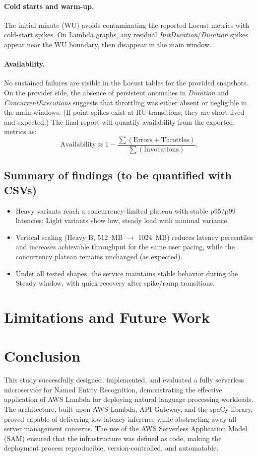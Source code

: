 \documentclass[11pt,a4paper]{article}
\begin{document}
\paragraph{Cold starts and warm-up.}
The initial minute (WU) avoids contaminating the reported Locust metrics with cold-start spikes. On Lambda graphs, any residual \emph{InitDuration}/\emph{Duration} spikes appear near the WU boundary, then disappear in the main window.

\paragraph{Availability.}
No sustained failures are visible in the Locust tables for the provided snapshots. On the provider side, the absence of persistent anomalies in \emph{Duration} and \emph{ConcurrentExecutions} suggests that throttling was either absent or negligible in the main windows. (If point spikes exist at RU transitions, they are short-lived and expected.) The final report will quantify availability from the exported metrics as:
\[
\text{Availability} \approx 1 - \frac{\sum(\text{Errors} + \text{Throttles})}{\sum(\text{Invocations})}.
\]

\subsection{Summary of findings (to be quantified with CSVs)}
\begin{itemize}
  \item Heavy variants reach a concurrency-limited plateau with stable p95/p99 latencies; Light variants show low, steady load with minimal variance.
  \item Vertical scaling (Heavy B, \SI{512}{MB} $\rightarrow$ \SI{1024}{MB}) reduces latency percentiles and increases achievable throughput for the same user pacing, while the concurrency plateau remains unchanged (as expected).
  \item Under all tested shapes, the service maintains stable behavior during the Steady window, with quick recovery after spike/ramp transitions.
\end{itemize}

\section{Limitations and Future Work}


\section{Conclusion}
This study successfully designed, implemented, and evaluated a fully serverless microservice for Named Entity Recognition, demonstrating the effective application of AWS Lambda for deploying natural language processing workloads. The architecture, built upon AWS Lambda, API Gateway, and the spaCy library, proved capable of delivering low-latency inference while abstracting away all server management concerns. The use of the AWS Serverless Application Model (SAM) ensured that the infrastructure was defined as code, making the deployment process reproducible, version-controlled, and automatable.
\end{document}
